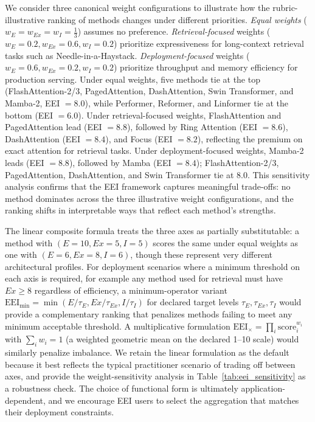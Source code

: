 \documentclass[10pt,twocolumn]{article}
\begin{document}
We consider three canonical weight configurations to illustrate how the rubric-illustrative ranking of methods changes under different priorities. \textit{Equal weights} ($w_E = w_{Ex} = w_I = \frac{1}{3}$) assumes no preference. \textit{Retrieval-focused} weights ($w_E = 0.2, w_{Ex} = 0.6, w_I = 0.2$) prioritize expressiveness for long-context retrieval tasks such as Needle-in-a-Haystack. \textit{Deployment-focused} weights ($w_E = 0.6, w_{Ex} = 0.2, w_I = 0.2$) prioritize throughput and memory efficiency for production serving. Under equal weights, five methods tie at the top (FlashAttention-2/3, PagedAttention, DashAttention, Swin Transformer, and Mamba-2, EEI $= 8.0$), while Performer, Reformer, and Linformer tie at the bottom (EEI $= 6.0$). Under retrieval-focused weights, FlashAttention and PagedAttention lead (EEI $= 8.8$), followed by Ring Attention (EEI $= 8.6$), DashAttention (EEI $= 8.4$), and Focus (EEI $= 8.2$), reflecting the premium on exact attention for retrieval tasks. Under deployment-focused weights, Mamba-2 leads (EEI $= 8.8$), followed by Mamba (EEI $= 8.4$); FlashAttention-2/3, PagedAttention, DashAttention, and Swin Transformer tie at 8.0. This sensitivity analysis confirms that the EEI framework captures meaningful trade-offs: no method dominates across the three illustrative weight configurations, and the ranking shifts in interpretable ways that reflect each method's strengths.

The linear composite formula treats the three axes as partially substitutable: a method with $(E=10, \mathit{Ex}=5, I=5)$ scores the same under equal weights as one with $(E=6, \mathit{Ex}=8, I=6)$, though these represent very different architectural profiles. For deployment scenarios where a minimum threshold on each axis is required, for example any method used for retrieval must have $\mathit{Ex} \geq 8$ regardless of efficiency, a minimum-operator variant $\text{EEI}_{\min} = \min(E/\tau_E, \mathit{Ex}/\tau_{Ex}, I/\tau_I)$ for declared target levels $\tau_E, \tau_{Ex}, \tau_I$ would provide a complementary ranking that penalizes methods failing to meet any minimum acceptable threshold. A multiplicative formulation $\text{EEI}_{\times} = \prod_i \mathrm{score}_i^{w_i}$ with $\sum_i w_i = 1$ (a weighted geometric mean on the declared 1--10 scale) would similarly penalize imbalance. We retain the linear formulation as the default because it best reflects the typical practitioner scenario of trading off between axes, and provide the weight-sensitivity analysis in Table~\ref{tab:eei_sensitivity} as a robustness check. The choice of functional form is ultimately application-dependent, and we encourage EEI users to select the aggregation that matches their deployment constraints.
\end{document}
